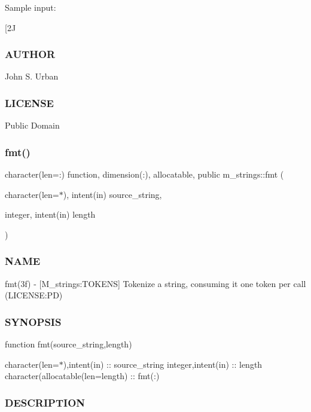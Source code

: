 Sample input\+: \begin{DoxyVerb}\e[2J
\tABC\tabc
\tA\a
\nONE\nTWO\nTHREE
\end{DoxyVerb}


\subsubsection*{A\+U\+T\+H\+OR}

John S. Urban \subsubsection*{L\+I\+C\+E\+N\+SE}

Public Domain \mbox{\label{namespacem__strings_afccf1e453a4315a639f133f2f7c0078b}} 
\subsubsection{\texorpdfstring{fmt()}{fmt()}}
{\footnotesize\ttfamily character(len=\+:) function, dimension(\+:), allocatable, public m\+\_\+strings\+::fmt (\begin{DoxyParamCaption}\item[{character(len=$\ast$), intent(in)}]{source\+\_\+string,  }\item[{integer, intent(in)}]{length }\end{DoxyParamCaption})}



\subsubsection*{N\+A\+ME}

fmt(3f) -\/ \mbox{[}M\+\_\+strings\+:T\+O\+K\+E\+NS\mbox{]} Tokenize a string, consuming it one token per call (L\+I\+C\+E\+N\+SE\+:PD) 

\subsubsection*{S\+Y\+N\+O\+P\+S\+IS}

function fmt(source\+\_\+string,length)

character(len=$\ast$),intent(in) \+:\+: source\+\_\+string integer,intent(in) \+:\+: length character(allocatable(len=length) \+:\+: fmt(\+:) \subsubsection*{D\+E\+S\+C\+R\+I\+P\+T\+I\+ON}

